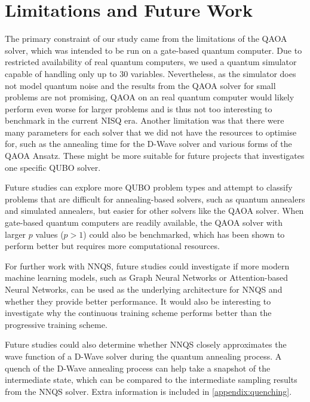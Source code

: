 \section{Limitations and Future Work}
The primary constraint of our study came from the limitations of the QAOA solver, which was intended to be run on a gate-based quantum computer. Due to restricted availability of real quantum computers, we used a quantum simulator capable of handling only up to $30$ variables. Nevertheless, as the simulator does not model quantum noise and the results from the QAOA solver for small problems are not promising, QAOA on an real quantum computer would likely perform even worse for larger problems and is thus not too interesting to benchmark in the current NISQ era. Another limitation was that there were many parameters for each solver that we did not have the resources to optimise for, such as the annealing time for the D-Wave solver and various forms of the QAOA Ansatz. These might be more suitable for future projects that investigates one specific QUBO solver.

Future studies can explore more QUBO problem types and attempt to classify problems that are difficult for annealing-based solvers, such as quantum annealers and simulated annealers, but easier for other solvers like the QAOA solver. When gate-based quantum computers are readily available, the QAOA solver with larger $p$ values ($p > 1$) could also be benchmarked, which has been shown to perform better but requires more computational resources.

For further work with NNQS, future studies could investigate if more modern machine learning models, such as Graph Neural Networks or Attention-based Neural Networks, can be used as the underlying architecture for NNQS and whether they provide better performance. It would also be interesting to investigate why the continuous training scheme performs better than the progressive training scheme.

Future studies could also determine whether NNQS closely approximates the wave function of a D-Wave solver during the quantum annealing process. A quench of the D-Wave annealing process can help take a snapshot of the intermediate state, which can be compared to the intermediate sampling results from the NNQS solver. Extra information is included in \autoref{appendix:quenching}.